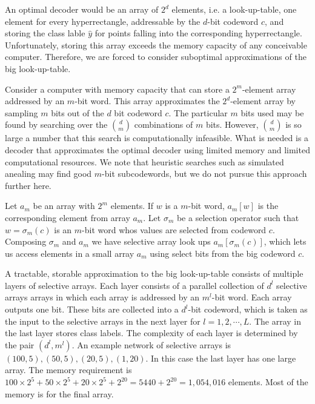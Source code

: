 \documentclass{article}
\begin{document}
An optimal decoder would be an array of $2^d$ elements, i.e. a look-up-table, one element for every hyperrectangle, addressable by the $d$-bit codeword $c$, and storing the class lable $\hat{y}$ for points falling into the corresponding hyperrectangle.  Unfortunately, storing this array exceeds the memory capacity of any conceivable computer.  Therefore, we are forced to consider suboptimal approximations of the big look-up-table.

Consider a computer with memory capacity that can store a $2^m$-element array addressed by an $m$-bit word.  This array approximates the $2^d$-element array by sampling $m$ bits out of the $d$ bit codeword $c$.  The particular $m$ bits used may be found by searching over the ${d \choose m}$ combinations of $m$ bits.  However, ${d \choose m}$ is so large a number that this search is computationally infeasible.  What is needed is a decoder that approximates the optimal decoder using limited memory and limited computational resources.  We note that heuristic searches such as simulated anealing may find good $m$-bit subcodewords, but we do not pursue this approach further here.

Let $a_{m}$ be an array with $2^m$ elements.  If $w$ is a $m$-bit word, $a_m[w]$ is the corresponding element from array $a_m$.  Let $\sigma_m$ be a selection operator such that $w=\sigma_m(c)$ is an $m$-bit word whos values are selected from codeword $c$.  Composing $\sigma_m$ and $a_m$ we have selective array look ups $a_m[\sigma_m(c)]$, which lets us access elements in a small array $a_m$ using select bits from the big codeword $c$.

A tractable, storable approximation to the big look-up-table consists of multiple layers of selective arrays.  Each layer consists of a parallel collection of $d^l$ selective arrays
arrays in which each array is addressed by an $m^l$-bit word.  Each array outputs one bit.  These bits are collected into a $d^l$-bit codeword, which is taken as the input to the selective arrays in the next layer for $l=1, 2, \cdots, L$.  The array in the last layer stores class labels.  The complexity of each layer is determined by the pair $(d^l,m^l)$.  An example network of selective arrays is $(100,5), (50,5), (20,5), (1,20)$.  In this case the last layer has one large array.  The memory requirement is $100 \times 2^5 + 50 \times 2^5 + 20 \times 2^5 + 2^{20} = 5440 + 2^{20} = 1,054,016$ elements.  Most of the memory is for the final array.
\end{document}
